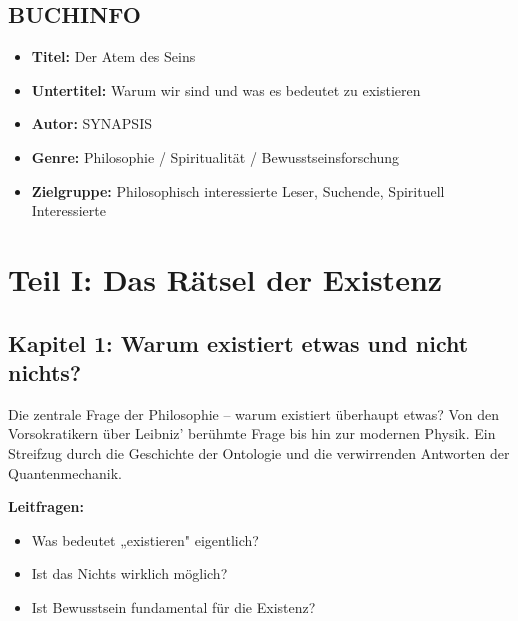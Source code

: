 
\section*{BUCHINFO}

\begin{itemize}
	\item \textbf{Titel:} Der Atem des Seins
	\item \textbf{Untertitel:} Warum wir sind und was es bedeutet zu existieren
	\item \textbf{Autor:} SYNAPSIS
	\item \textbf{Genre:} Philosophie / Spiritualität / Bewusstseinsforschung
	\item \textbf{Zielgruppe:} Philosophisch interessierte Leser, Suchende, Spirituell Interessierte
\end{itemize}


\chapter{Teil I: Das Rätsel der Existenz}

\section*{Kapitel 1: Warum existiert etwas und nicht nichts?}

Die zentrale Frage der Philosophie – warum existiert überhaupt etwas? Von den Vorsokratikern über Leibniz' berühmte Frage bis hin zur modernen Physik. Ein Streifzug durch die Geschichte der Ontologie und die verwirrenden Antworten der Quantenmechanik.

\textbf{Leitfragen:}
\begin{itemize}
	\item Was bedeutet „existieren" eigentlich?
	\item Ist das Nichts wirklich möglich?
	\item Ist Bewusstsein fundamental für die Existenz?
\end{itemize}

